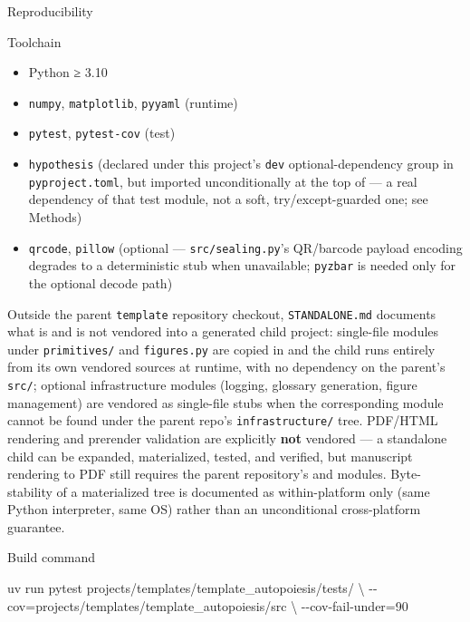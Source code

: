 \documentclass[
  ignorenonframetext,
]{beamer}
\newenvironment{Shaded}{}{}
\newcommand{\AttributeTok}[1]{\textcolor[rgb]{0.49,0.56,0.16}{#1}}
\newcommand{\DataTypeTok}[1]{\textcolor[rgb]{0.56,0.13,0.00}{#1}}
\newcommand{\ExtensionTok}[1]{#1}
\newcommand{\NormalTok}[1]{#1}
\newcommand{\OperatorTok}[1]{\textcolor[rgb]{0.40,0.40,0.40}{#1}}
\providecommand{\tightlist}{%
  \setlength{\itemsep}{0pt}\setlength{\parskip}{0pt}}
\begin{document}
\begin{frame}{Reproducibility}
\begin{block}{Toolchain}
\protect{}\label{toolchain}
\begin{itemize}
\tightlist
\item
  Python ≥ 3.10
\item
  \texttt{numpy}, \texttt{matplotlib}, \texttt{pyyaml} (runtime)
\item
  \texttt{pytest}, \texttt{pytest-cov} (test)
\item
  \texttt{hypothesis}  (declared under this project's \texttt{dev}
  optional-dependency group in \texttt{pyproject.toml}, but imported
  unconditionally at the top of 
  --- a real dependency of that test module, not a soft,
  try/except-guarded one; see Methods)
\item
  \texttt{qrcode}, \texttt{pillow} (optional ---
  \texttt{src/sealing.py}'s QR/barcode payload encoding degrades to a
  deterministic stub when unavailable; \texttt{pyzbar} is needed only
  for the optional decode path)
\end{itemize}

Outside the parent \texttt{template} repository checkout,
\texttt{STANDALONE.md} documents what is and is not vendored into a
generated child project: single-file modules under \texttt{primitives/}
and \texttt{figures.py} are copied in and the child runs entirely from
its own vendored sources at runtime, with no dependency on the parent's
\texttt{src/}; optional infrastructure modules (logging, glossary
generation, figure management) are vendored as single-file stubs when
the corresponding module cannot be found under the parent repo's
\texttt{infrastructure/} tree. PDF/HTML rendering and prerender
validation are explicitly \textbf{not} vendored --- a standalone child
can be expanded, materialized, tested, and verified, but manuscript
rendering to PDF still requires the parent repository's
 and 
modules. Byte-stability of a materialized tree is documented as
within-platform only (same Python interpreter, same OS) rather than an
unconditional cross-platform guarantee.
\end{block}

\begin{block}{Build command}
\protect{}\label{build-command}
\begin{Shaded}
\begin{Highlighting}[]
\ExtensionTok{uv}\NormalTok{ run pytest projects/templates/template\_autopoiesis/tests/ }\DataTypeTok{\textbackslash{}}
  \AttributeTok{{-}{-}cov}\OperatorTok{=}\NormalTok{projects/templates/template\_autopoiesis/src }\DataTypeTok{\textbackslash{}}
  \AttributeTok{{-}{-}cov{-}fail{-}under}\OperatorTok{=}\NormalTok{90}
\end{Highlighting}
\end{Shaded}


\end{block}
\end{frame}
\end{document}
